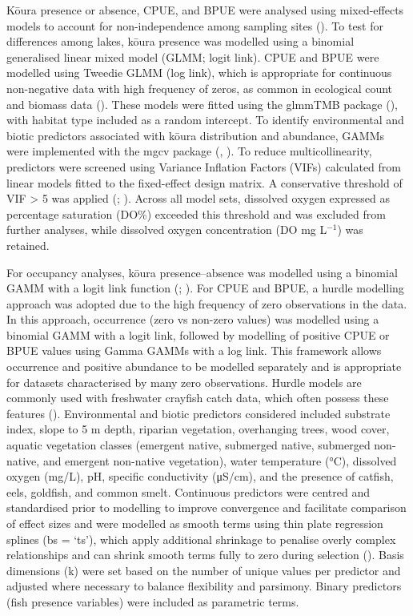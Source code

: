 \documentclass[
  letterpaper,
  DIV=11,
  numbers=noendperiod]{scrartcl}
\begin{document}
Kōura presence or absence, CPUE, and BPUE were analysed using
mixed-effects models to account for non-independence among sampling
sites (). To test for
differences among lakes, kōura presence was modelled using a binomial
generalised linear mixed model (GLMM; logit link). CPUE and BPUE were
modelled using Tweedie GLMM (log link), which is appropriate for
continuous non-negative data with high frequency of zeros, as common in
ecological count and biomass data (). These models were fitted using the glmmTMB package
(), with habitat type
included as a random intercept. To identify environmental and biotic
predictors associated with kōura distribution and abundance, GAMMs were
implemented with the mgcv package (,
). To reduce multicollinearity, predictors
were screened using Variance Inflation Factors (VIFs) calculated from
linear models fitted to the fixed-effect design matrix. A conservative
threshold of VIF \textgreater{} 5 was applied
(;
). Across all model sets,
dissolved oxygen expressed as percentage saturation (DO\%) exceeded this
threshold and was excluded from further analyses, while dissolved oxygen
concentration (DO mg L\(^{-1}\)) was retained.

For occupancy analyses, kōura presence--absence was modelled using a
binomial GAMM with a logit link function (; ). For CPUE and BPUE,
a hurdle modelling approach was adopted due to the high frequency of
zero observations in the data. In this approach, occurrence (zero vs
non-zero values) was modelled using a binomial GAMM with a logit link,
followed by modelling of positive CPUE or BPUE values using Gamma GAMMs
with a log link. This framework allows occurrence and positive abundance
to be modelled separately and is appropriate for datasets characterised
by many zero observations. Hurdle models are commonly used with
freshwater crayfish catch data, which often possess these features
(). Environmental
and biotic predictors considered included substrate index, slope to 5 m
depth, riparian vegetation, overhanging trees, wood cover, aquatic
vegetation classes (emergent native, submerged native, submerged
non-native, and emergent non-native vegetation), water temperature (°C),
dissolved oxygen (mg/L), pH, specific conductivity (μS/cm), and the
presence of catfish, eels, goldfish, and common smelt. Continuous
predictors were centred and standardised prior to modelling to improve
convergence and facilitate comparison of effect sizes and were modelled
as smooth terms using thin plate regression splines (bs = `ts'), which
apply additional shrinkage to penalise overly complex relationships and
can shrink smooth terms fully to zero during selection
(). Basis dimensions (k) were set
based on the number of unique values per predictor and adjusted where
necessary to balance flexibility and parsimony. Binary predictors (fish
presence variables) were included as parametric terms.
\end{document}
